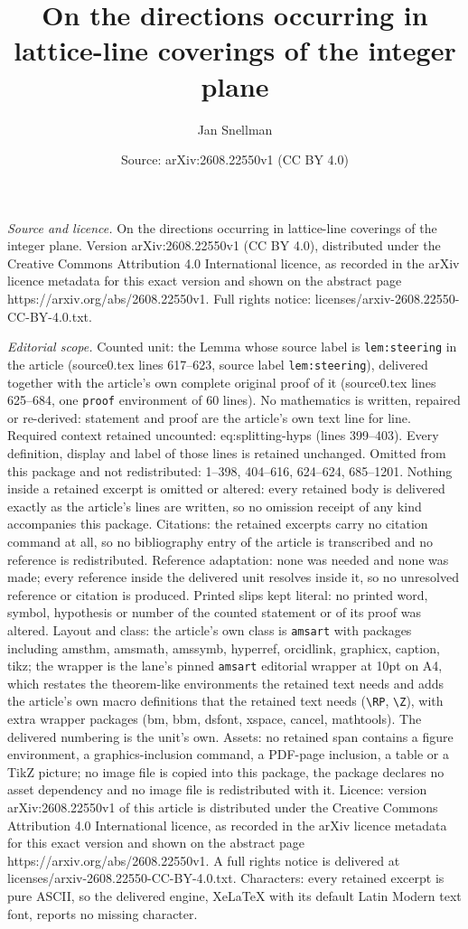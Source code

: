 \documentclass[10pt,a4paper]{amsart}
\title[On the directions occurring in lattice-line coverings of the]{On the directions occurring in lattice-line coverings of the integer plane}
\author{Jan Snellman}
\date{Source: arXiv:2608.22550v1 (CC BY 4.0)}
\begin{document}
\maketitle

\noindent\emph{Source and licence.} On the directions occurring in lattice-line coverings of the integer plane. Version arXiv:2608.22550v1 (CC BY 4.0), distributed under the Creative Commons Attribution 4.0 International licence, as recorded in the arXiv licence metadata for this exact version and shown on the abstract page https://arxiv.org/abs/2608.22550v1. Full rights notice: licenses/arxiv-2608.22550-CC-BY-4.0.txt.\par\smallskip

\noindent\textit{Editorial scope.} Counted unit: the Lemma whose source label is \texttt{lem:steering} in the article (source0.tex lines 617--623, source label \texttt{lem:steering}), delivered together with the article's own complete original proof of it (source0.tex lines 625--684, one \texttt{proof} environment of 60 lines). No mathematics is written, repaired or re-derived: statement and proof are the article's own text line for line. Required context retained uncounted: eq:splitting-hyps (lines 399--403). Every definition, display and label of those lines is retained unchanged. Omitted from this package and not redistributed: 1--398, 404--616, 624--624, 685--1201. Nothing inside a retained excerpt is omitted or altered: every retained body is delivered exactly as the article's lines are written, so no omission receipt of any kind accompanies this package. Citations: the retained excerpts carry no citation command at all, so no bibliography entry of the article is transcribed and no reference is redistributed. Reference adaptation: none was needed and none was made; every reference inside the delivered unit resolves inside it, so no unresolved reference or citation is produced. Printed slips kept literal: no printed word, symbol, hypothesis or number of the counted statement or of its proof was altered. Layout and class: the article's own class is \texttt{amsart} with packages including amsthm, amsmath, amssymb, hyperref, orcidlink, graphicx, caption, tikz; the wrapper is the lane's pinned \texttt{amsart} editorial wrapper at 10pt on A4, which restates the theorem-like environments the retained text needs and adds the article's own macro definitions that the retained text needs (\texttt{\textbackslash RP}, \texttt{\textbackslash Z}), with extra wrapper packages (bm, bbm, dsfont, xspace, cancel, mathtools). The delivered numbering is the unit's own. Assets: no retained span contains a figure environment, a graphics-inclusion command, a PDF-page inclusion, a table or a TikZ picture; no image file is copied into this package, the package declares no asset dependency and no image file is redistributed with it. Licence: version arXiv:2608.22550v1 of this article is distributed under the Creative Commons Attribution 4.0 International licence, as recorded in the arXiv licence metadata for this exact version and shown on the abstract page https://arxiv.org/abs/2608.22550v1. A full rights notice is delivered at licenses/arxiv-2608.22550-CC-BY-4.0.txt. Characters: every retained excerpt is pure ASCII, so the delivered engine, XeLaTeX with its default Latin Modern text font, reports no missing character.
\end{document}
